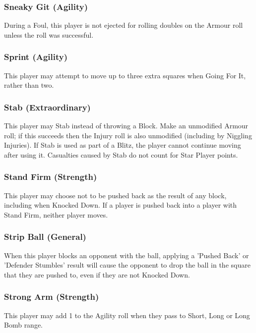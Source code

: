 \begin{multicols}{3}
\subsubsection{Sneaky Git (Agility)}
\par During a Foul, this player is not ejected for rolling doubles on the Armour roll unless the roll was successful.

\subsubsection{Sprint (Agility)}
\par This player may attempt to move up to three extra squares when Going For It, rather than two.

\subsubsection{Stab (Extraordinary)}
\par This player may Stab instead of throwing a Block. Make an unmodified Armour roll; if this succeeds then the Injury roll is also unmodified (including by Niggling Injuries). If Stab is used as part of a Blitz, the player cannot continue moving after using it. Casualties caused by Stab do not count for Star Player points.

\subsubsection{Stand Firm (Strength)}
\par This player may choose not to be pushed back as the result of any block, including when Knocked Down. If a player is pushed back into a player with Stand Firm, neither player moves.

\subsubsection{Strip Ball (General)}
\par When this player blocks an opponent with the ball, applying a 'Pushed Back' or 'Defender Stumbles' result will cause the opponent to drop the ball in the square that they are pushed to, even if they are not Knocked Down.

\subsubsection{Strong Arm (Strength)}
\par This player may add 1 to the Agility roll when they pass to Short, Long or Long Bomb range.


\end{multicols}
